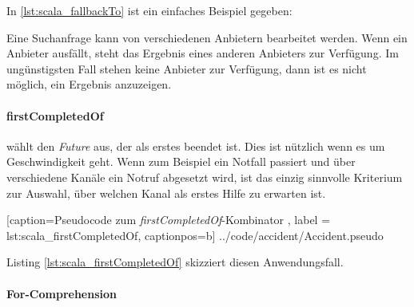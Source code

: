 In \ref{lst:scala_fallbackTo} ist ein einfaches Beispiel gegeben:

Eine Suchanfrage kann von verschiedenen Anbietern bearbeitet werden. 
Wenn ein Anbieter ausfällt, steht das Ergebnis eines anderen Anbieters 
zur Verfügung. Im ungünstigsten Fall stehen keine Anbieter zur Verfügung, 
dann ist es nicht möglich, ein Ergebnis anzuzeigen.

\paragraph{firstCompletedOf} wählt den \emph{Future} aus, der als
erstes beendet ist. Dies ist nützlich wenn es um Geschwindigkeit
geht. Wenn zum Beispiel ein Notfall passiert und über verschiedene
Kanäle ein Notruf abgesetzt wird, ist das einzig sinnvolle Kriterium
zur Auswahl, über welchen Kanal als erstes Hilfe zu erwarten ist.


    [caption={Pseudocode zum \emph{firstCompletedOf}-Kombinator },
       label = lst:scala_firstCompletedOf,
       captionpos=b]
 {../code/accident/Accident.pseudo}
 
Listing \ref{lst:scala_firstCompletedOf} skizziert diesen
Anwendungsfall.

\paragraph{For-Comprehension}
